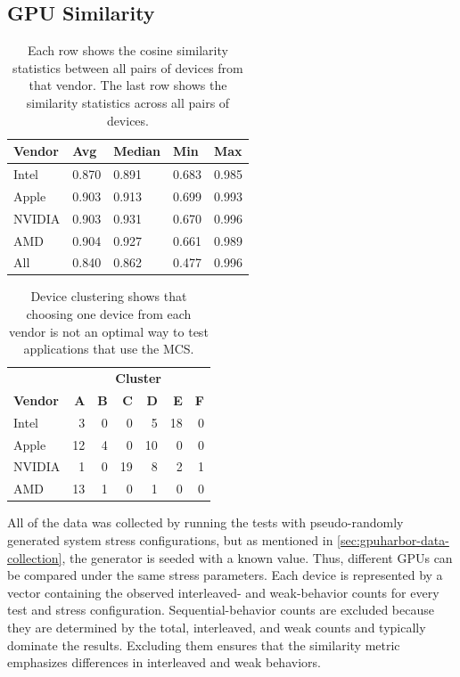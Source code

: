 \subsection{GPU Similarity \label{sec:gpuharbor-webgpu-sim}}

\begin{table}
\centering
\caption{Each row shows the cosine similarity statistics between all pairs of devices from that vendor. The last row shows the similarity statistics across all pairs of devices.}
\begingroup
{}
\begin{tabularx}{\columnwidth}{X Y Y Y Y }
\toprule
\textbf{Vendor} & \textbf{Avg} & \textbf{Median} & \textbf{Min} & \textbf{Max} \\
\midrule
Intel & 0.870 & 0.891 & 0.683 & 0.985 \\
Apple & 0.903 & 0.913 & 0.699 & 0.993 \\
NVIDIA & 0.903 & 0.931 & 0.670 & 0.996 \\
AMD & 0.904 & 0.927 & 0.661 & 0.989 \\ \hline
All & 0.840 & 0.862 & 0.477 & 0.996 \\
\bottomrule
\end{tabularx}
\endgroup
\label{tab:gpuharbor-webgpu-sim-stats}
\end{table}

\begin{table}
\centering
\caption{Device clustering shows that choosing one device from each vendor is not an optimal way to test applications that use the MCS.}
\begingroup
{}
\begin{tabularx}{.7\columnwidth}{ X r r r r r r }
\toprule
& \multicolumn{6}{c}{\textbf{Cluster}} \\
\cmidrule(lr){2-7}
\textbf{Vendor} & \textbf{A} & \textbf{B} & \textbf{C} & \textbf{D} & \textbf{E} & \textbf{F} \\
\midrule
Intel & 3 & 0 & 0 & 5 & 18 & 0 \\
Apple & 12 & 4 & 0 & 10 & 0 & 0 \\
NVIDIA & 1 & 0 & 19 & 8 & 2 & 1 \\
AMD & 13 & 1 & 0 & 1 & 0 & 0 \\
\bottomrule
\end{tabularx}
\endgroup
\label{tab:gpuharbor-webgpu-clusters}
\end{table}

All of the data was collected by running the tests with pseudo-randomly generated system stress configurations, but as mentioned in \mysec\ref{sec:gpuharbor-data-collection}, the generator is seeded with a known value. Thus, different GPUs can be compared under the same stress parameters. Each device is represented by a vector containing the observed interleaved- and weak-behavior counts for every test and stress configuration. Sequential-behavior counts are excluded because they are determined by the total, interleaved, and weak counts and typically dominate the results. Excluding them ensures that the similarity metric emphasizes differences in interleaved and weak behaviors.

